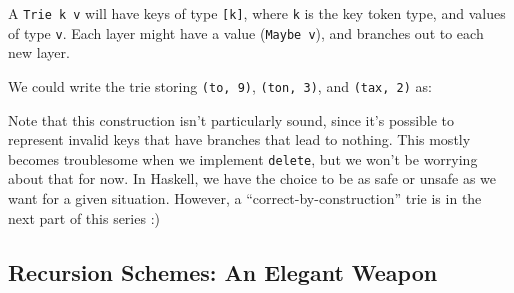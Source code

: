 \documentclass[]{article}
\newenvironment{Shaded}{}{}
\newcommand{\CharTok}[1]{\textcolor[rgb]{0.25,0.44,0.63}{#1}}
\newcommand{\CommentTok}[1]{\textcolor[rgb]{0.38,0.63,0.69}{\textit{#1}}}
\newcommand{\DataTypeTok}[1]{\textcolor[rgb]{0.56,0.13,0.00}{#1}}
\newcommand{\DecValTok}[1]{\textcolor[rgb]{0.25,0.63,0.44}{#1}}
\newcommand{\FunctionTok}[1]{\textcolor[rgb]{0.02,0.16,0.49}{#1}}
\newcommand{\NormalTok}[1]{#1}
\newcommand{\OtherTok}[1]{\textcolor[rgb]{0.00,0.44,0.13}{#1}}
\begin{document}
A \texttt{Trie\ k\ v} will have keys of type \texttt{{[}k{]}}, where \texttt{k}
is the key token type, and values of type \texttt{v}. Each layer might have a
value (\texttt{Maybe\ v}), and branches out to each new layer.

We could write the trie storing \texttt{(to,\ 9)}, \texttt{(ton,\ 3)}, and
\texttt{(tax,\ 2)} as:

\begin{Shaded}
\end{Shaded}

Note that this construction isn't particularly sound, since it's possible to
represent invalid keys that have branches that lead to nothing. This mostly
becomes troublesome when we implement \texttt{delete}, but we won't be worrying
about that for now. In Haskell, we have the choice to be as safe or unsafe as we
want for a given situation. However, a ``correct-by-construction'' trie is in
the next part of this series :)

\hypertarget{recursion-schemes-an-elegant-weapon}{%
\subsection{Recursion Schemes: An Elegant
Weapon}\label{recursion-schemes-an-elegant-weapon}}
\end{document}
